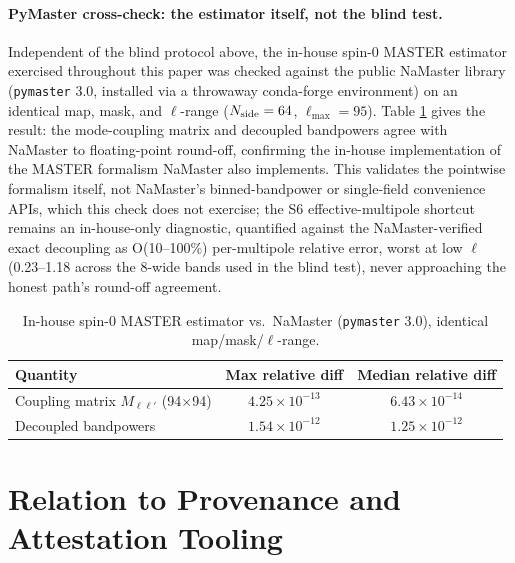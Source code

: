 \documentclass[11pt]{article}
\begin{document}
\paragraph{PyMaster cross-check: the estimator itself, not the blind test.}
\label{sec:pymaster-crosscheck}
Independent of the blind protocol above, the in-house spin-0 MASTER
estimator exercised throughout this paper was checked against the public
NaMaster library (\texttt{pymaster} 3.0, installed via a throwaway
conda-forge environment) on an identical map, mask, and \(\ell\)-range
(\(N_{\rm side}=64\), \(\ell_{\max}=95\)). Table \ref{tab:pymaster} gives the
result: the mode-coupling matrix and decoupled bandpowers agree with
NaMaster to floating-point round-off, confirming the in-house implementation
of the MASTER formalism NaMaster also implements. This validates the
pointwise formalism itself, not NaMaster's binned-bandpower or single-field
convenience APIs, which this check does not exercise; the S6
effective-multipole shortcut remains an in-house-only diagnostic, quantified
against the NaMaster-verified exact decoupling as O(10--100\%) per-multipole
relative error, worst at low \(\ell\) (0.23--1.18 across the 8-wide bands
used in the blind test), never approaching the honest path's round-off
agreement.

\begin{table}[h]
\centering
\caption{In-house spin-0 MASTER estimator vs.\ NaMaster (\texttt{pymaster} 3.0), identical map/mask/\(\ell\)-range.}
\label{tab:pymaster}
\begin{tabular}{@{}lcc@{}}
\toprule
Quantity & Max relative diff & Median relative diff \\
\midrule
Coupling matrix \(M_{\ell\ell'}\) (94\(\times\)94) & \(4.25\times10^{-13}\) & \(6.43\times10^{-14}\) \\
Decoupled bandpowers & \(1.54\times10^{-12}\) & \(1.25\times10^{-12}\) \\
\bottomrule
\end{tabular}
\end{table}

\section{Relation to Provenance and Attestation Tooling}
\label{sec:related-work}
\end{document}
